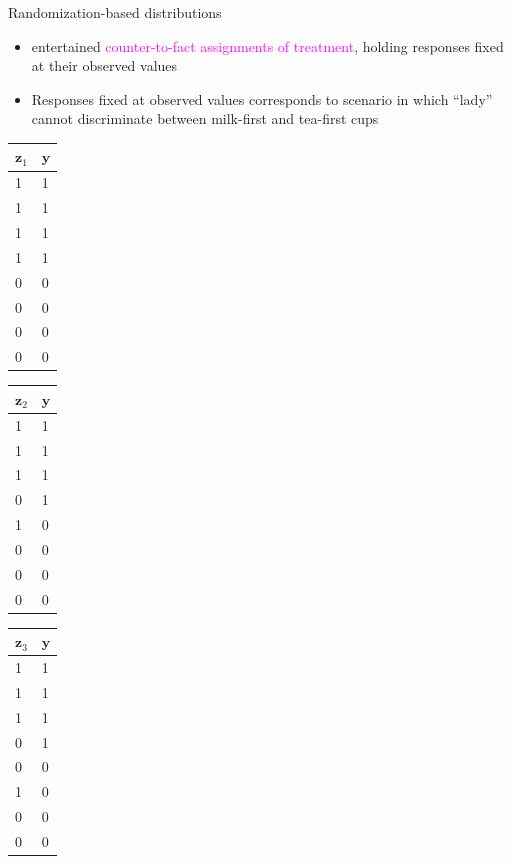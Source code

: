 \documentclass[table, xcolor = {dvipsnames}, 9pt]{beamer}
\theoremstyle{plain}
\begin{document}
\begin{frame}{Randomization-based distributions}
\vfill
\begin{itemize} \vfill
\item \citet{fisher1935a} entertained \textcolor{magenta}{counter-to-fact assignments of treatment}, holding responses fixed at their observed values \vfill
\item Responses fixed at observed values corresponds to scenario in which ``lady'' cannot discriminate between milk-first and tea-first cups \vfill
\end{itemize} \vfill 
\begin{table}[H]
\scriptsize
    \begin{tabular}{l|l}
    \toprule
    $\mathbf{z}_1$ & $\mathbf{y}$ \\ \midrule
    1 & 1  \\
    1 & 1   \\
    1 & 1   \\
    1 & 1  \\
    0 & 0  \\
    0 & 0  \\
    0 & 0  \\
    0 & 0  
    \end{tabular}
    \hfill
      \begin{tabular}{l|l}
      \toprule
    $\mathbf{z}_2$ & $\mathbf{y}$ \\ \midrule
    1 &  1  \\
    1 &  1  \\
    1 &  1  \\
    0 &  1   \\
    1 &  0  \\
    0 &  0  \\
    0 &  0  \\
    0 &  0  
    \end{tabular}
     \hfill
      \begin{tabular}{l|l}
      \toprule
    $\mathbf{z}_3$ & $\mathbf{y}$ \\ \midrule
    1 & 1  \\
    1 & 1  \\
    1 & 1  \\
    0 & 1   \\
    0 & 0  \\
    1 & 0  \\
    0 & 0  \\
    0 & 0  
    \end{tabular}

\end{table}
\end{frame}
\end{document}
